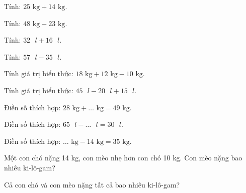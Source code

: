 \begin{ex}
Tính: $25\text{ kg} + 14\text{ kg}$.
\end{ex}

\begin{ex}
Tính: $48\text{ kg} - 23\text{ kg}$.
\end{ex}

\begin{ex}
Tính: $32\text{ }l + 16\text{ }l$.
\end{ex}

\begin{ex}
Tính: $57\text{ }l - 35\text{ }l$.
\end{ex}

\begin{ex}
Tính giá trị biểu thức: $18\text{ kg} + 12\text{ kg} - 10\text{ kg}$.
\end{ex}

\begin{ex}
Tính giá trị biểu thức: $45\text{ }l - 20\text{ }l + 15\text{ }l$.
\end{ex}

\begin{ex}
Điền số thích hợp: $28\text{ kg} + \dots\text{ kg} = 49\text{ kg}$.
\end{ex}

\begin{ex}
Điền số thích hợp: $65\text{ }l - \dots\text{ }l = 30\text{ }l$.
\end{ex}

\begin{ex}
Điền số thích hợp: $\dots\text{ kg} - 14\text{ kg} = 35\text{ kg}$.
\end{ex}

\begin{ex}
Một con chó nặng 14 kg, con mèo nhẹ hơn con chó 10 kg. Con mèo nặng bao nhiêu ki-lô-gam?
\end{ex}

\begin{ex}
Cả con chó và con mèo nặng tất cả bao nhiêu ki-lô-gam?
\end{ex}


